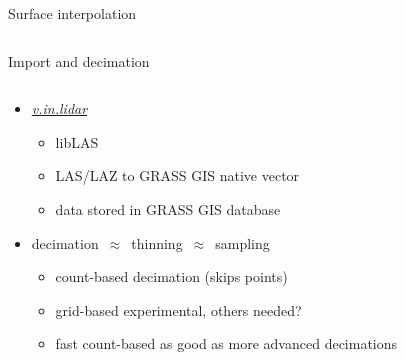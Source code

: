 \documentclass[xcolor={dvipsnames,usenames},beamer,aspectratio=169]{beamer}
\newcommand{\gmodule}[1]{\href{http://grass.osgeo.org/grass71/manuals/#1.html}{\emph{#1}}}
\begin{document}
\begin{frame}{Surface interpolation}
\begin{columns}
\begin{column}{0.4\textwidth}
\end{column}
\end{columns}

\end{frame}


\begin{frame}{Import and decimation}

\begin{columns}
\begin{column}{0.58\textwidth}

\begin{itemize}
  \item \gmodule{v.in.lidar}
  \begin{itemize}
   \item libLAS
   \item LAS/LAZ to GRASS GIS native vector
    \item data stored in GRASS GIS database
  \end{itemize}
  \item decimation~$\approx$~thinning~$\approx$~sampling
  \begin{itemize}
    \item count-based decimation (skips points)
    \item grid-based experimental, others needed?  %
    \item fast count-based as good as more advanced decimations
  \end{itemize}
\end{itemize}

\end{column}
\begin{column}{0.22\textwidth}



\end{column}
\end{columns}
\end{frame}
\end{document}

